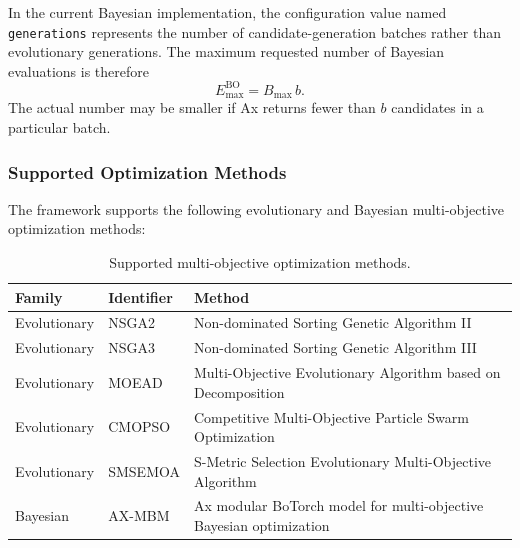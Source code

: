 In the current Bayesian implementation, the configuration value named \texttt{generations}
represents the number of candidate-generation batches rather than evolutionary generations. The
maximum requested number of Bayesian evaluations is therefore
\begin{equation}
    E_{\max}^{\mathrm{BO}} = B_{\max}\,b .
\end{equation}
The actual number may be smaller if Ax returns fewer than $b$ candidates in a particular batch.

\subsubsection{Supported Optimization Methods}

The framework supports the following evolutionary and Bayesian multi-objective optimization methods:

\begin{table}[H]
\centering
\caption{Supported multi-objective optimization methods.}
\label{tab:algorithms_sc}
\begin{tabularx}{\textwidth}{@{}l l >{\raggedright\arraybackslash}X@{}}
\toprule
\textbf{Family} & \textbf{Identifier} & \textbf{Method} \\
\midrule
Evolutionary & NSGA2 & Non-dominated Sorting Genetic Algorithm II \\
Evolutionary & NSGA3 & Non-dominated Sorting Genetic Algorithm III \\
Evolutionary & MOEAD & Multi-Objective Evolutionary Algorithm based on Decomposition \\
Evolutionary & CMOPSO & Competitive Multi-Objective Particle Swarm Optimization \\
Evolutionary & SMSEMOA & S-Metric Selection Evolutionary Multi-Objective Algorithm \\
Bayesian & AX-MBM & Ax modular BoTorch model for multi-objective Bayesian optimization \\
\bottomrule
\end{tabularx}
\end{table}


